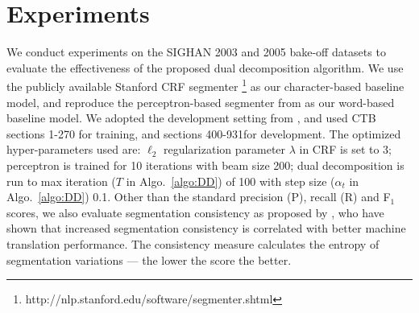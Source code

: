 \section{Experiments}


We conduct experiments on the SIGHAN 2003 \cite{Sproat:2003:SIGHAN} and 2005 \cite{Emerson:2005:SIGHAN} bake-off datasets to evaluate the effectiveness of the proposed dual decomposition algorithm. We use the publicly available Stanford CRF segmenter \cite{Tseng:2005:SIGHAN}\footnote{http://nlp.stanford.edu/software/segmenter.shtml} as our character-based baseline model, and reproduce the perceptron-based segmenter from  as our word-based baseline model.
We adopted the development setting from \cite{Zhang:2007:ACL}, and used CTB sections 1-270 for training, and sections 400-931for development. The optimized hyper-parameters used are: $\ell_{2}$ regularization parameter $\lambda$ in CRF is set to $3$; perceptron is trained for 10 iterations with beam size 200; dual decomposition is run to max iteration ($T$ in Algo.~\ref{algo:DD}) of 100 with step size ($\alpha_t$ in Algo.~\ref{algo:DD}) 0.1. Other than the standard precision (P), recall (R) and F$_1$ scores, we also evaluate segmentation consistency as proposed by \cite{Chang:2008:ACL}, who have shown that increased segmentation consistency is correlated with better machine translation performance. The consistency measure calculates the entropy of segmentation variations --- the lower the score the better. 
